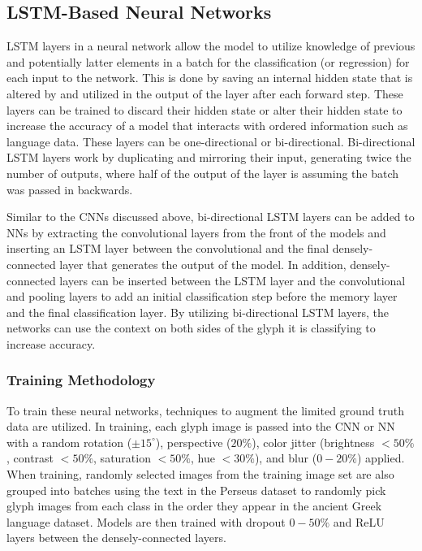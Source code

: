 \subsection{LSTM-Based Neural Networks}
LSTM layers in a neural network allow the model to utilize knowledge of previous and potentially latter elements in a batch for the classification (or regression) for each input to the network. This is done by saving an internal hidden state that is altered by and utilized in the output of the layer after each forward step. These layers can be trained to discard their hidden state or alter their hidden state to increase the accuracy of a model that interacts with ordered information such as language data. These layers can be one-directional or bi-directional. Bi-directional LSTM layers work by duplicating and mirroring their input, generating twice the number of outputs, where half of the output of the layer is assuming the batch was passed in backwards.

Similar to the CNNs discussed above, bi-directional LSTM layers can be added to NNs by extracting the convolutional layers from the front of the models and inserting an LSTM layer between the convolutional and the final densely-connected layer that generates the output of the model. In addition, densely-connected layers can be inserted between the LSTM layer and the convolutional and pooling layers to add an initial classification step before the memory layer and the final classification layer. By utilizing bi-directional LSTM layers, the networks can use the context on both sides of the glyph it is classifying to increase accuracy.

\subsubsection{Training Methodology}
To train these neural networks, techniques to augment the limited ground truth data are utilized. In training, each glyph image is passed into the CNN or NN with a random rotation ($\pm 15^\circ$), perspective ($20\%$), color jitter (brightness $<50\%$, contrast $<50\%$, saturation $<50\%$, hue $<30\%$), and blur ($0-20\%$) applied. When training, randomly selected images from the training image set are also grouped into batches using the text in the Perseus dataset to randomly pick glyph images from each class in the order they appear in the ancient Greek language dataset. Models are then trained with dropout $0-50\%$ and ReLU layers between the densely-connected layers.

